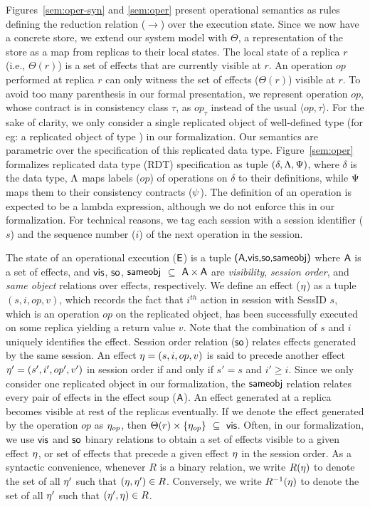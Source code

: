 Figures~\ref{sem:oper-syn} and \ref{sem:oper} present operational semantics as
rules defining the reduction relation ($\xrightarrow{}$) over the execution
state.  Since we now have a concrete store, we extend our system model with
$\Theta$, a representation of the store as a map from replicas to their local
states. The local state of a replica $r$ (i.e., $\Theta(r)$) is a set of
effects that are currently visible at $r$. An operation $op$ performed at
replica $r$ can only witness the set of effects ($\Theta(r)$) visible at $r$.
To avoid too many parenthesis in our formal presentation, we represent
operation $op$, whose contract is in consistency class $\tau$, as $op_\tau$
instead of the usual $\langle op,\tau \rangle$. For the sake of clarity, we
only consider a single replicated object of well-defined type (for eg: a
replicated object of type ) in our formalization.  Our
semantics are parametric over the specification of this replicated data type.
Figure~\ref{sem:oper} formalizes replicated data type (RDT) specification as
tuple $(\delta,\Lambda,\Psi)$, where $\delta$ is the data type, $\Lambda$ maps
labels ($op$) of operations on $\delta$ to their definitions, while $\Psi$
maps them to their consistency contracts ($\psi$). The definition of an
operation is expected to be a lambda expression, although we do not enforce
this in our formalization. For technical reasons, we tag each session with a
session identifier ($s$) and the sequence number ($i$) of the next operation in
the session.

The state of an operational execution (${\normalfont \textsf{E}}$) is a tuple ${\normalfont \textsf{({\normalfont \textsf{A}},\allowbreak {\normalfont \textsf{vis}},\allowbreak {\normalfont \textsf{so}},\allowbreak {\normalfont \textsf{sameobj}})}}$ where
${\normalfont \textsf{A}}$ is a set of effects, and ${\normalfont \textsf{vis}}$, ${\normalfont \textsf{so}}$, ${\normalfont \textsf{sameobj}}$ $\subseteq$
${\normalfont \textsf{A}} \times {\normalfont \textsf{A}}$ are \emph{visibility}, \emph{session order}, and
\emph{same object} relations over effects, respectively. We define an effect
($\eta$) as a tuple $(s,i,op,v)$, which records the fact that $i^{th}$ action
in session with {\sf SessID} $s$, which is an operation $op$ on the replicated
object, has been successfully executed on some replica yielding a return value
$v$. Note that the combination of $s$ and $i$ uniquely identifies the effect.
Session order relation (${\normalfont \textsf{so}}$) relates effects generated by the same session.
An effect $\eta = (s,i,op,v)$ is said to precede another effect $\eta' =
(s',i',op',v')$ in session order if and only if $s'=s$ and $i'\ge i$. Since we
only consider one replicated object in our formalization, the ${\normalfont \textsf{sameobj}}$
relation relates every pair of effects in the effect soup (${\normalfont \textsf{A}}$). An
effect generated at a replica becomes visible at rest of the replicas
eventually.  If we denote the effect generated by the operation $op$ as
$\eta_{op}$, then $\Theta(r) \times \{\eta_{op}\} ~\subseteq~ {\normalfont \textsf{vis}}$. Often, in
our formalization, we use ${\normalfont \textsf{vis}}$ and ${\normalfont \textsf{so}}$ binary relations to obtain a set
of effects visible to a given effect $\eta$, or set of effects that precede a
given effect $\eta$ in the session order. As a syntactic convenience, whenever
$R$ is a binary relation, we write $R(\eta)$ to denote the set of all $\eta'$
such that $(\eta,\eta') \in R$.  Conversely, we write $R^{-1}(\eta)$ to denote
the set of all $\eta'$ such that $(\eta',\eta) \in R$.

